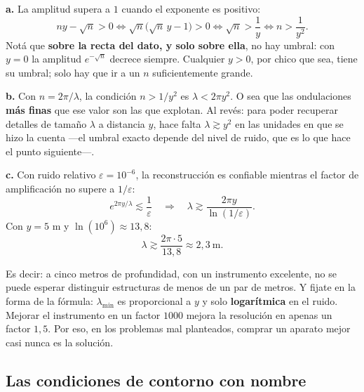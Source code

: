 \documentclass[
  spanish,
  a4paper,
]{scrbook}
\theoremstyle{definition}
\theoremstyle{plain}
\theoremstyle{definition}
\theoremstyle{plain}
\theoremstyle{definition}
\theoremstyle{remark}
\begin{document}
\begin{tcolorbox}[enhanced jigsaw, arc=.35mm, bottomrule=.15mm, bottomtitle=1mm, breakable, colback=white, colbacktitle=quarto-callout-tip-color!10!white, colframe=quarto-callout-tip-color-frame, coltitle=black, left=2mm, leftrule=.75mm, opacityback=0, opacitybacktitle=0.6, rightrule=.15mm, title=\textcolor{quarto-callout-tip-color}{\faLightbulb}\hspace{0.5em}{Solución}, titlerule=0mm, toprule=.15mm, toptitle=1mm]

\textbf{a.} La amplitud supera a \(1\) cuando el exponente es positivo:
\[
ny - \sqrt n > 0 \iff \sqrt n\big(\sqrt n\,y - 1\big) > 0 \iff \sqrt n > \frac1y
\iff n > \frac{1}{y^{2}} .
\] Notá que \textbf{sobre la recta del dato, y solo sobre ella}, no hay
umbral: con \(y=0\) la amplitud \(e^{-\sqrt n}\) decrece siempre.
Cualquier \(y>0\), por chico que sea, tiene su umbral; solo hay que ir a
un \(n\) suficientemente grande.

\textbf{b.} Con \(n = 2\pi/\lambda\), la condición \(n > 1/y^2\) es
\(\lambda < 2\pi y^{2}\). O sea que las ondulaciones \textbf{más finas}
que ese valor son las que explotan. Al revés: para poder recuperar
detalles de tamaño \(\lambda\) a distancia \(y\), hace falta
\(\lambda \gtrsim y^2\) en las unidades en que se hizo la cuenta ---el
umbral exacto depende del nivel de ruido, que es lo que hace el punto
siguiente---.

\textbf{c.} Con ruido relativo \(\varepsilon = 10^{-6}\), la
reconstrucción es confiable mientras el factor de amplificación no
supere a \(1/\varepsilon\): \[
e^{2\pi y/\lambda} \lesssim \frac{1}{\varepsilon}
\quad\Longrightarrow\quad
\lambda \gtrsim \frac{2\pi y}{\ln(1/\varepsilon)} .
\] Con \(y = 5\) m y \(\ln(10^{6}) \approx 13{,}8\):
\[\lambda \gtrsim \frac{2\pi\cdot 5}{13{,}8} \approx 2{,}3\ \text{m}.\]

Es decir: a cinco metros de profundidad, con un instrumento excelente,
no se puede esperar distinguir estructuras de menos de un par de metros.
Y fijate en la forma de la fórmula: \(\lambda_{\min}\) es proporcional a
\(y\) y solo \textbf{logarítmica} en el ruido. Mejorar el instrumento en
un factor \(1000\) mejora la resolución en apenas un factor \(1{,}5\).
Por eso, en los problemas mal planteados, comprar un aparato mejor casi
nunca es la solución.

\end{tcolorbox}

\subsection{Las condiciones de contorno con
nombre}\label{sec-condiciones}
\end{document}
